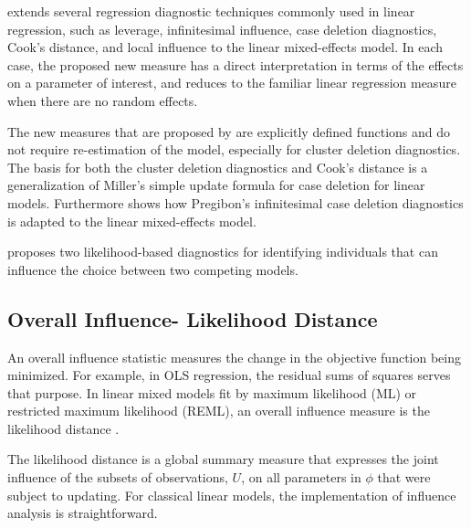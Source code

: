 \documentclass[12pt, a4paper]{report}
\theoremstyle{plain}
\theoremstyle{definition}
\theoremstyle{remark}
\begin{document}
\citet{Demi} extends several regression diagnostic techniques commonly used in linear regression, such as leverage, infinitesimal influence, case deletion diagnostics, Cook's distance, and local influence to the linear mixed-effects model. In each case, the proposed new measure has a direct interpretation in terms of the effects on a parameter of interest, and reduces to the familiar linear regression measure when there are no random effects.

The new measures that are proposed by \citet{Demi} are explicitly defined functions and do not require re-estimation of the model, especially for cluster deletion diagnostics. The basis for both the cluster deletion diagnostics and Cook's distance is a generalization of Miller's simple update formula for case deletion for linear models. Furthermore \citet{Demi} shows how Pregibon's infinitesimal case deletion diagnostics is adapted to the linear mixed-effects model.

\citet{Demi} proposes two likelihood-based diagnostics for identifying individuals that can influence the choice between two competing models.


\subsection{Overall Influence- Likelihood Distance}
An overall influence statistic measures the change in the objective function being minimized. For example, in
OLS regression, the residual sums of squares serves that purpose. In linear mixed models fit by
 maximum likelihood (ML) or  restricted maximum likelihood (REML), an overall influence measure is the  likelihood distance \citep{CookWeisberg}.

	
	The  likelihood distance is a global summary measure that expresses the joint influence of the subsets of observations, $U$, on all parameters in $\phi$ that were subject to updating. For classical linear models, the implementation of influence analysis is straightforward.
	
\end{document}
